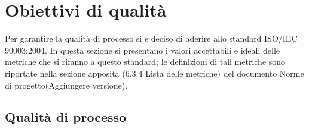     
\newpage
\section{Obiettivi di qualità}
Per garantire la qualità di processo si è deciso di aderire allo standard ISO/IEC 90003:2004. In questa sezione si presentano i valori accettabili e ideali delle metriche che si rifanno a questo standard; le definizioni di tali metriche sono riportate nella sezione apposita (\color{red}6.3.4 Lista delle metriche\color{black}) del documento Norme di progetto(\color{red}Aggiungere versione\color{black}).
\subsection{Qualità di processo}
